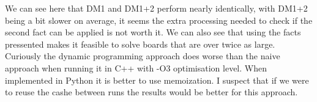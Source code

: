 \documentclass{article}
\begin{document}
We can see here that DM1 and DM1+2 perform nearly identically, with DM1+2 being a bit slower on average, it seems the extra processing needed to check if the second fact can be applied is not worth it. We can also see that using the facts pressented makes it feasible to solve boards that are over twice as large. 
Curiously the dynamic programming approach does worse than the naive approach when running it in C++ with -O3 optimisation level. When implemented in Python it is better to use memoization. I suspect that if we were to reuse the cashe between runs the results would be better for this approach. 
\end{document}
